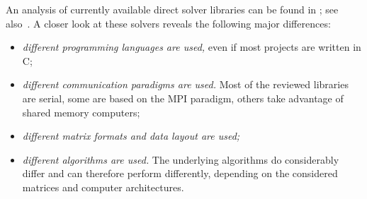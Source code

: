 \documentclass[acmtocl]{acmtrans2m}
\begin{document}
An analysis of currently available direct solver libraries can be found
in \cite{davis05summary}; see also~\cite[Section 6.7]{dongarra98numerical}.
A closer look at these solvers reveals the following major
differences:
\begin{itemize}
\item {\sl different programming languages are used,} even if most projects are
written in C;

\item {\sl different communication paradigms are used.} 
 Most of the reviewed libraries are serial, some are based on the MPI
 paradigm, others take advantage of shared memory computers;

\item {\sl different matrix formats and data layout are used;}

\item {\sl different algorithms are used.} The underlying algorithms do
considerably differ
and can therefore perform differently, depending on the considered matrices and
computer architectures.

\end{itemize}
\end{document}
